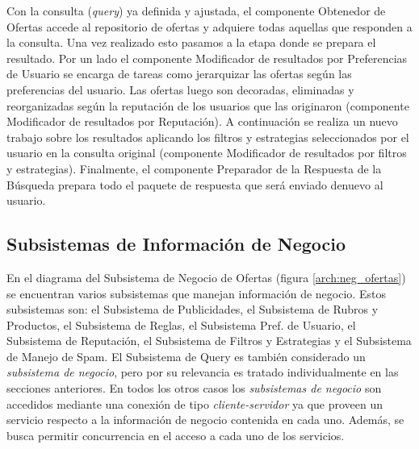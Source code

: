 Con la consulta (\emph{query}) ya definida y ajustada, el componente \textsf{Obtenedor de Ofertas} accede al repositorio de ofertas y adquiere todas aquellas que responden a la consulta.  Una vez realizado esto pasamos a la etapa donde se prepara el resultado. Por un lado el componente \textsf{Modificador de resultados por Preferencias de Usuario} se encarga de tareas como jerarquizar las ofertas según las preferencias del usuario. Las ofertas luego son decoradas, eliminadas y reorganizadas según la reputación de los usuarios que las originaron (componente \textsf{Modificador de resultados por Reputación}). A continuación se realiza un nuevo trabajo sobre los resultados aplicando los filtros y estrategias seleccionados por el usuario en la consulta original (componente \textsf{Modificador de resultados por filtros y estrategias}). Finalmente, el componente \textsf{Preparador de la Respuesta de la Búsqueda} prepara todo el paquete de respuesta que será enviado denuevo al usuario. 

\subsection{Subsistemas de Información de Negocio}

En el diagrama del \textsf{Subsistema de Negocio de Ofertas} (figura \ref{arch:neg_ofertas}) se encuentran varios subsistemas que manejan información de negocio. Estos subsistemas son: el \textsf{Subsistema de Publicidades}, el \textsf{Subsistema de Rubros y Productos}, el \textsf{Subsistema de Reglas}, el \textsf{Subsistema Pref. de Usuario}, el \textsf{Subsistema de Reputación}, el \textsf{Subsistema de Filtros y Estrategias} y el \textsf{Subsistema de Manejo de Spam}. El \textsf{Subsistema de Query} es también considerado un \emph{subsistema de negocio}, pero por su relevancia es tratado individualmente en las secciones anteriores.
En todos los otros casos los \emph{subsistemas de negocio} son accedidos mediante una conexión de tipo \emph{cliente-servidor} ya que proveen un servicio respecto a la información de negocio contenida en cada uno. Además, se busca permitir concurrencia en el acceso a cada uno de los servicios.

